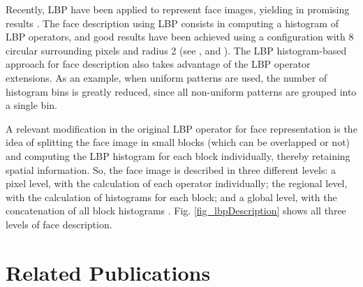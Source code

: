 \begin{appendices}
Recently, LBP have been applied to represent face images, yielding in promising results \cite{ahonen2004face}. The face description using LBP consists in computing a histogram of LBP operators, and good results have been achieved using a configuration with 8 circular surrounding pixels and radius 2 (see \cite{ahonen2004face}, \cite{ahonen2006face} and \cite{Rodriguez06}). The LBP histogram-based approach for face description also takes advantage of the LBP operator extensions. As an example, when uniform patterns are used, the number of histogram bins is greatly reduced, since all non-uniform patterns are grouped into a single bin.

A relevant modification in the original LBP operator for face representation is the idea of splitting the face image in small blocks (which can be overlapped or not) and computing the LBP histogram for each block individually, thereby retaining spatial information. So, the face image is described in three different levels: a pixel level, with the calculation of each operator individually; the regional level, with the calculation of histograms for each block; and a global level, with the concatenation of all block histograms \cite{Rodriguez06}. Fig. \ref{fig_lbpDescription} shows all three levels of face description.


\chapter{Related Publications}
\label{AppendixB}


\end{appendices}